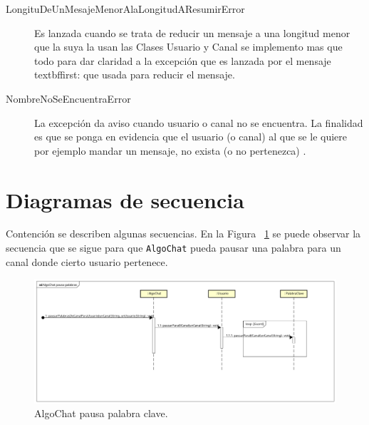 \documentclass[titlepage,a4paper]{article}
\begin{document}
\begin{description}
\item[LongituDeUnMesajeMenorAlaLongitudAResumirError] Es lanzada cuando se trata de reducir un mensaje a una longitud menor que la suya la usan las Clases Usuario y Canal se implemento mas que todo para dar claridad a la excepción que es lanzada por el mensaje \\textbf{first:} que usada para reducir el mensaje.
\item[NombreNoSeEncuentraError] La excepción da aviso cuando usuario o canal no se encuentra. La finalidad es que se ponga en evidencia que el usuario (o canal) al que se le quiere por ejemplo mandar un mensaje, no exista (o no pertenezca) .
\end{description}

\section{Diagramas de secuencia}\label{sec:diagramasdesecuencia}
Contención se describen algunas secuencias. 
En la Figura ~\ref{fig:seq02} se puede observar la secuencia que se sigue para que \verb|AlgoChat| pueda pausar una palabra para un canal donde cierto usuario pertenece.
\begin{figure}[H]
\centering
\includegraphics[width=\textwidth]{DiagramasDeSecuencias/AlgoChat_pausa_palabras.png}
\caption{\label{fig:seq02}AlgoChat pausa palabra clave.}
\end{figure}
\end{document}
